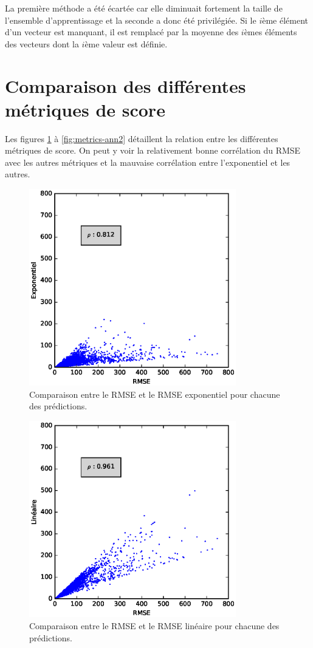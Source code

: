 \documentclass[letterpaper]{article}
\begin{document}
\begin{appendices}
La première méthode a été écartée car elle diminuait fortement la taille de l'ensemble d'apprentissage et la seconde a donc été privilégiée. Si le $i$ème élément d'un vecteur est manquant, il est remplacé par la moyenne des $i$èmes éléments des vecteurs dont la $i$ème valeur est définie.

\section{Comparaison des différentes métriques de score}

Les figures \ref{fig:metrics-ann1} à \ref{fig:metrics-ann2} détaillent la relation entre les différentes métriques de score. On peut y voir la relativement bonne corrélation du RMSE avec les autres métriques et la mauvaise corrélation entre l'exponentiel et les autres.

\begin{figure}[h]
   \centerline{\includegraphics[width=9cm]{metrics-dist-exp.eps}}
   \caption{\label{fig:metrics-ann1}Comparaison entre le RMSE et le RMSE exponentiel pour chacune des prédictions.}
\end{figure}

\begin{figure}[h]
   \centerline{\includegraphics[width=9cm]{metrics-dist-lin.eps}}
   \caption{Comparaison entre le RMSE et le RMSE linéaire pour chacune des prédictions.}
\end{figure}


\end{appendices}
\end{document}
